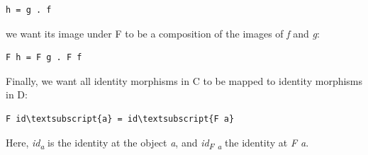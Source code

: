 \begin{Verbatim}[commandchars=\\\{\}]
h = g . f
\end{Verbatim}
we want its image under F to be a composition of the images of \emph{f}
and \emph{g}:

\begin{Verbatim}[commandchars=\\\{\}]
F h = F g . F f
\end{Verbatim}

\begin{figure}[H]
\centering
{}
\end{figure}

\noindent
Finally, we
want all identity morphisms in C to be mapped to identity morphisms in
D:

\begin{Verbatim}[commandchars=\\\{\}]
F id\textsubscript{a} = id\textsubscript{F a}
\end{Verbatim}
Here, \emph{id\textsubscript{a}} is the identity at the object \emph{a},
and \emph{id\textsubscript{F a}} the identity at \emph{F a}.

\begin{figure}
\centering
{}
\end{figure}

